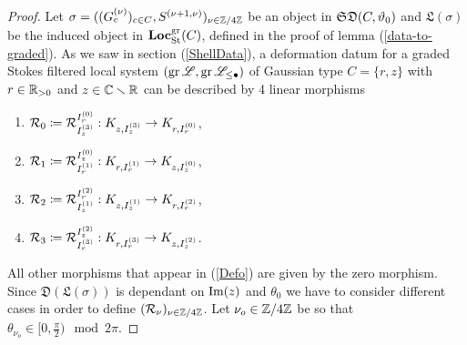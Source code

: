\begin{proof} Let $\sigma = ((G_c^{(\nu)})_{c \in C}, S^{(\nu+1,\nu)})_{\nu \in \mathbb{Z}/4\mathbb{Z}}$ be an object in $\mathfrak{SD}(C,\vartheta_0)$ and $\mathfrak{L}(\sigma)$ be the induced object in $\mathbf{Loc}_{\textrm{St}}^{\operatorname{gr}}(C)$, defined in the proof of lemma (\ref{data-to-graded}).
    As we saw in section (\ref{ShellData}), a deformation datum for a graded Stokes filtered local system $(\operatorname{gr}\mathscr{L},\operatorname{gr}\mathscr{L}_{\leq \bullet})$ of Gaussian type $C=\{r,z\}$ with $r \in \mathbb{R}_{>0}$ and $z \in \mathbb{C} \smallsetminus \mathbb{R}$ can be described by 4 linear morphisms 
    \begin{multicols}{2} %
    \begin{enumerate}
        \item $\mathcal{R}_0 \coloneqq \mathcal{R}_{I_z^{(3)}}^{I_r^{(0)}}:K_{z,I_z^{(3)}} \to K_{r,I_r^{(0)}}$,
        \item $\mathcal{R}_1 \coloneqq \mathcal{R}_{I_r^{(1)}}^{I_z^{(0)}}: K_{r, I_r^{(1)}} \to K_{z,I_z^{(0)}}$,
        \item $\mathcal{R}_2 \coloneqq \mathcal{R}_{I_z^{(1)}}^{I_r^{(2)}}: K_{z,I_z^{(1)}} \to K_{r,I_r^{(2)}}$,
        \item $\mathcal{R}_3 \coloneqq \mathcal{R}_{I_r^{(3)}}^{I_z^{(2)}}: K_{r, I_r^{(3)}} \to K_{z,I_z^{(2)}}$. 
    \end{enumerate}
    \end{multicols}
    All other morphisms that appear in (\ref{Defo}) are given by the zero morphism. Since $\mathfrak{D}(\mathfrak{L}(\sigma))$ is dependant on $\operatorname{Im}(z)$ and $\theta_0$ we have to consider different cases in order to define $(\mathcal{R}_\nu)_{\nu \in \mathbb{Z}/4\mathbb{Z}}$. Let $\nu_o \in \mathbb{Z}/4\mathbb{Z}$ be so that $\theta_{\nu_o} \in [0,\frac{\pi}{2}) \mod 2\pi$.


\end{proof}
